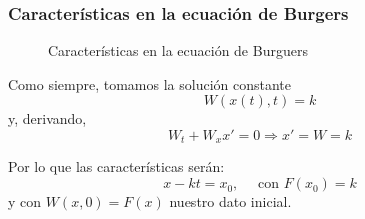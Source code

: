 		\subsubsection{Características en la ecuación de Burgers}

			\begin{figure}[hbtp]
				\centering
				\caption{Características en la ecuación de Burguers}
				\label{fig:CaracteristicasBurger}
			\end{figure}

			Como siempre, tomamos la solución constante \[ W(x(t),t) = k \] y, derivando,
			\[ W_t + W_x x' = 0 \Rightarrow x' = W = k \]

			Por lo que las características serán: \[ x-kt = x_0, \quad \text{ con }F(x_0) = k \] y con $W(x,0) = F(x)$ nuestro dato inicial.



